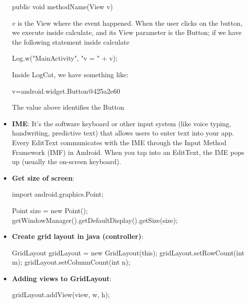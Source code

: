 \documentclass{report}
\begin{document}
\begin{itemize}
            \begin{javacode}
            public void methodName(View v) 
            \end{javacode}
            \bigbreak \noindent 
            $v$ is the View where the event happened.
            \bigbreak \noindent 
            When the user clicks on the button, we execute inside calculate, and its View parameter is the Button; if we have the following statement inside calculate
            \bigbreak \noindent 
            \begin{javacode}
            Log.w("MainActivity", "v = " + v);
            \end{javacode}
            \bigbreak \noindent 
            Inside LogCat, we have something like:
            \bigbreak \noindent 
            \begin{javacode}
            v=android.widget.Button@425a2e60
            \end{javacode}
            \bigbreak \noindent 
            The value above identifies the Button
        \item \textbf{IME}: It’s the software keyboard or other input system (like voice typing, handwriting, predictive text) that allows users to enter text into your app.
            \bigbreak \noindent 
            Every EditText communicates with the IME through the Input Method Framework (IMF) in Android.
            \bigbreak \noindent 
            When you tap into an EditText, the IME pops up (usually the on-screen keyboard).
        \item \textbf{Get size of screen}: 
            \bigbreak \noindent 
            \begin{javacode}
                import android.graphics.Point;

                Point size = new Point();
                getWindowManager().getDefaultDisplay().getSize(size);
            \end{javacode}
        \item \textbf{Create grid layout in java (controller)}:
            \bigbreak \noindent 
            \begin{javacode}
                GridLayout gridLayout = new GridLayout(this);
                gridLayout.setRowCount(int m);
                gridLayout.setColumnCount(int n);
            \end{javacode}
        \item \textbf{Adding views to GridLayout}:
            \bigbreak \noindent 
            \begin{javacode}
                gridLayout.addView(view, w, h);


\end{javacode}
\end{itemize}
\end{document}
